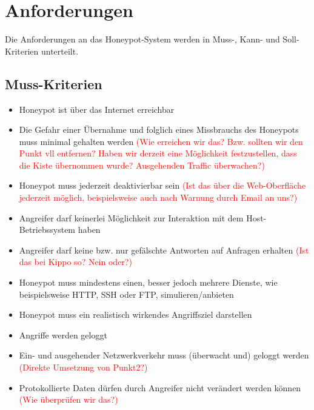 \chapter{Anforderungen}
\label{ch:Anforderungen}

Die Anforderungen an das Honeypot-System werden in Muss-, Kann- und Soll-Kriterien unterteilt.


\section{Muss-Kriterien}
\label{sec:Muss-Kriterien}
\begin{itemize}
\item Honeypot ist über das Internet erreichbar
\item Die Gefahr einer Übernahme und folglich eines Missbrauchs des Honeypots muss minimal gehalten werden \textcolor{red}{(Wie erreichen wir das? Bzw. sollten wir den Punkt vll entfernen? Haben wir derzeit eine Möglichkeit festzustellen, dass die Kiste übernommen wurde? Ausgehenden Traffic überwachen?)}
\item Honeypot muss jederzeit deaktivierbar sein \textcolor{red}{(Ist das über die Web-Oberfläche jederzeit möglich, beispielsweise auch nach Warnung durch Email an uns?)}
\item Angreifer darf keinerlei Möglichkeit zur Interaktion mit dem Host-Betriebssystem haben
\item Angreifer darf keine bzw. nur gefälschte Antworten auf Anfragen erhalten \textcolor{red}{(Ist das bei Kippo so? Nein oder?)}
\item Honeypot muss mindestens einen, besser jedoch mehrere Dienste, wie beispielsweise HTTP, SSH oder FTP, simulieren/anbieten
\item Honeypot muss ein realistisch wirkendes Angriffsziel darstellen
\item Angriffe werden geloggt
\item Ein- und ausgehender Netzwerkverkehr muss (überwacht und) geloggt werden \textcolor{red}{(Direkte Umsetzung von Punkt2?)}
\item Protokollierte Daten dürfen durch Angreifer nicht verändert werden können \textcolor{red}{(Wie überprüfen wir das?)}

\end{itemize}

\newpage

